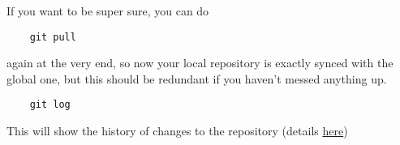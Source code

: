 \documentclass[10pt]{article}
\begin{document}
If you want to be super sure, you can do 
\begin{verbatim}
	git pull
\end{verbatim}
again at the very end, so now your local repository is exactly synced with the global one, but this should be redundant if you haven't messed anything up.


\begin{verbatim}
	git log
\end{verbatim}
This will show the history of changes to the repository (details \href{https://git-scm.com/docs/git-log}{here})
    
    
\end{document}
